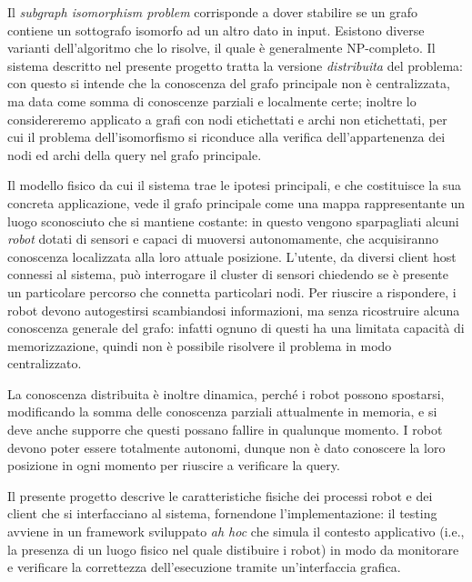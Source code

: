 Il \emph{subgraph isomorphism problem} corrisponde a dover
stabilire se un grafo contiene un sottografo isomorfo ad
un altro dato in input.
Esistono diverse varianti dell'algoritmo che lo risolve, il quale è
generalmente NP-completo.
Il sistema descritto nel presente progetto
tratta la versione \emph{distribuita} del problema:
con questo si intende che la conoscenza del grafo principale non
è centralizzata, ma data come somma di conoscenze parziali e
localmente certe; inoltre lo considereremo applicato
a grafi con nodi etichettati e archi non etichettati,
per cui il problema dell'isomorfismo si riconduce alla verifica
dell'appartenenza dei nodi ed archi della query nel grafo principale.

Il modello fisico da cui il sistema trae le ipotesi principali,
e che costituisce la sua concreta applicazione, vede il grafo
principale come una mappa rappresentante un luogo sconosciuto
che si mantiene costante:
in questo vengono sparpagliati alcuni \emph{robot}
dotati di sensori e capaci di muoversi autonomamente, che acquisiranno
conoscenza localizzata alla loro attuale posizione.
L'utente, da diversi client host connessi al sistema, può
interrogare il cluster di sensori chiedendo se è
presente un particolare percorso che connetta particolari nodi.
Per riuscire a rispondere, i robot devono autogestirsi scambiandosi
informazioni, ma senza ricostruire alcuna conoscenza generale del grafo:
infatti ognuno di questi ha una limitata capacità di memorizzazione,
quindi non è possibile risolvere il problema in modo centralizzato.

La conoscenza distribuita è inoltre dinamica, perché i robot
possono spostarsi, modificando la somma delle conoscenza parziali
attualmente in memoria, e si deve anche supporre che questi possano
fallire in qualunque momento.
I robot devono poter essere totalmente autonomi, dunque non
è dato conoscere la loro posizione in ogni momento per
riuscire a verificare la query.

Il presente progetto descrive le caratteristiche fisiche dei
processi robot e dei client che si interfacciano al sistema,
fornendone l'implementazione: il testing
avviene in un framework sviluppato \emph{ah hoc}
che simula il contesto applicativo (i.e., la presenza di un luogo
fisico nel quale distibuire i robot)
in modo da monitorare e verificare la correttezza dell'esecuzione
tramite un'interfaccia grafica.

